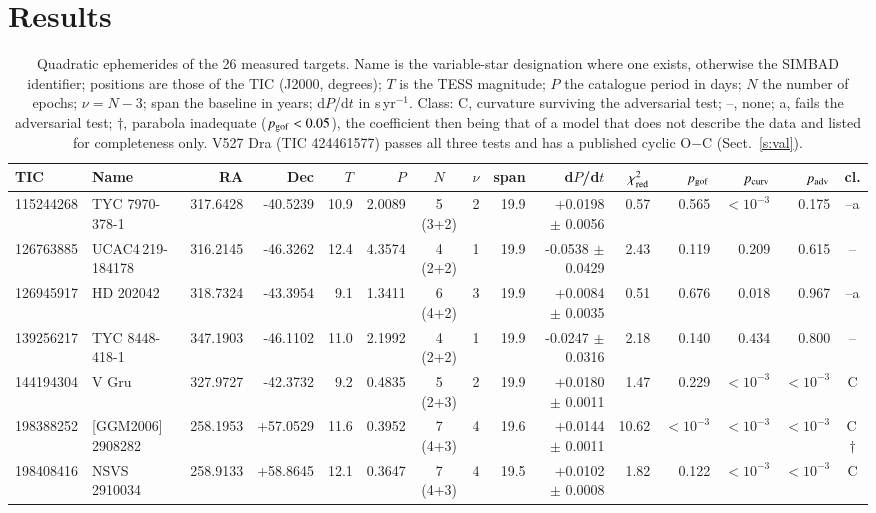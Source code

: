 \documentclass{aa}
\begin{document}
\section{Results}\label{s:res}
\begin{table}
\caption{Quadratic ephemerides of the 26 measured targets. Name is the variable-star designation where one exists, otherwise the SIMBAD identifier; positions are those of the TIC (J2000, degrees); $T$ is the TESS magnitude; $P$ the catalogue period in days; $N$ the number of epochs; $\nu=N-3$; span the baseline in years; d$P$/d$t$ in s\,yr$^{-1}$. Class: C, curvature surviving the adversarial test; --, none; a, fails the adversarial test; $\dagger$, parabola inadequate ($p_{\rm gof}<0.05$), the coefficient then being that of a model that does not describe the data and listed for completeness only. V527 Dra (TIC 424461577) passes all three tests and has a published cyclic O$-$C (Sect.~\ref{s:val}).}
\label{t:coef}
\centering
\tiny
\begin{tabular}{l l r r r r c c r r r r r r c}
\hline\hline
TIC & Name & RA & Dec & $T$ & $P$ & $N$ & $\nu$ & span & d$P$/d$t$ & $\chi^2_{\rm red}$ & $p_{\rm gof}$ & $p_{\rm curv}$ & $p_{\rm adv}$ & cl.\\
\hline
115244268 & TYC 7970-378-1 & 317.6428 & -40.5239 & 10.9 & 2.0089 & 5 (3+2) & 2 & 19.9 & +0.0198 $\pm$ 0.0056 & 0.57 & 0.565 & $<10^{-3}$ & 0.175 & --a\\
126763885 & UCAC4\,219-184178 & 316.2145 & -46.3262 & 12.4 & 4.3574 & 4 (2+2) & 1 & 19.9 & -0.0538 $\pm$ 0.0429 & 2.43 & 0.119 & 0.209 & 0.615 & --\\
126945917 & HD 202042 & 318.7324 & -43.3954 & 9.1 & 1.3411 & 6 (4+2) & 3 & 19.9 & +0.0084 $\pm$ 0.0035 & 0.51 & 0.676 & 0.018 & 0.967 & --a\\
139256217 & TYC 8448-418-1 & 347.1903 & -46.1102 & 11.0 & 2.1992 & 4 (2+2) & 1 & 19.9 & -0.0247 $\pm$ 0.0316 & 2.18 & 0.140 & 0.434 & 0.800 & --\\
144194304 & V Gru & 327.9727 & -42.3732 & 9.2 & 0.4835 & 5 (2+3) & 2 & 19.9 & +0.0180 $\pm$ 0.0011 & 1.47 & 0.229 & $<10^{-3}$ & $<10^{-3}$ & C\\
198388252 & [GGM2006] 2908282 & 258.1953 & +57.0529 & 11.6 & 0.3952 & 7 (4+3) & 4 & 19.6 & +0.0144 $\pm$ 0.0011 & 10.62 & $<10^{-3}$ & $<10^{-3}$ & $<10^{-3}$ & C\,$\dagger$\\
198408416 & NSVS 2910034 & 258.9133 & +58.8645 & 12.1 & 0.3647 & 7 (4+3) & 4 & 19.5 & +0.0102 $\pm$ 0.0008 & 1.82 & 0.122 & $<10^{-3}$ & $<10^{-3}$ & C\\

\end{tabular}
\end{table}
\end{document}

